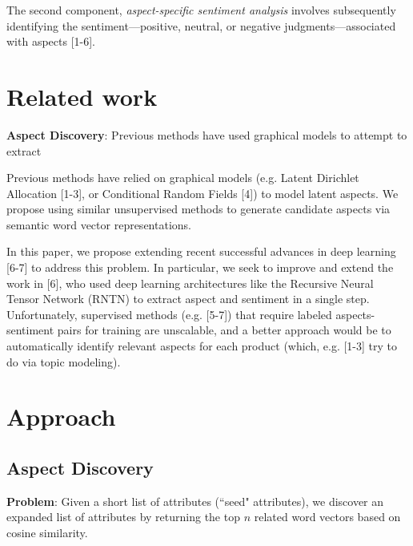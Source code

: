 \documentclass{article} %
\begin{document}
The second component, \textit{aspect-specific sentiment analysis} involves subsequently identifying the sentiment---positive, neutral, or negative judgments---associated with aspects [1-6]. 






\section{Related work}

\textbf{Aspect Discovery}: Previous methods have used graphical models to attempt to extract 

Previous methods have relied on graphical models (e.g. Latent Dirichlet Allocation [1-3], or Conditional Random Fields [4]) to model latent aspects. We propose using similar unsupervised methods to generate candidate aspects via semantic word vector representations. 

In this paper, we propose extending recent successful advances in deep learning [6-7] to address this problem. In particular, we seek to improve and extend the work in [6], who used deep learning architectures like the Recursive Neural Tensor Network (RNTN) to extract aspect and sentiment in a single step. Unfortunately, supervised methods (e.g. [5-7]) that require labeled aspects-sentiment pairs for training are unscalable, and a better approach would be to automatically identify relevant aspects for each product (which, e.g. [1-3] try to do via topic modeling). 




\section{Approach}


\subsection{Aspect Discovery}

\textbf{Problem}: Given a short list of attributes (``seed" attributes), we discover an expanded list of attributes by returning the top $n$ related word vectors based on cosine similarity.
\end{document}
